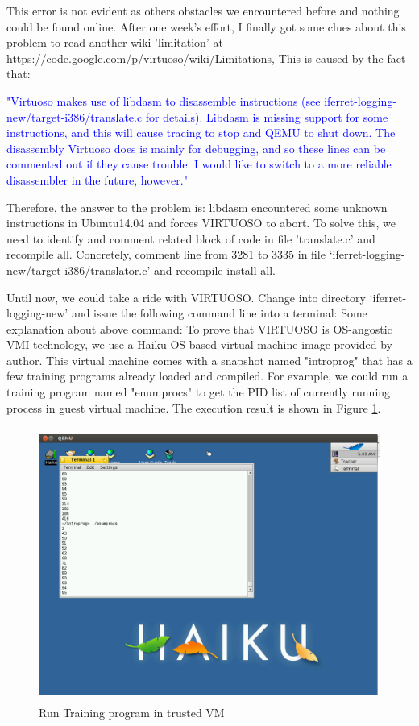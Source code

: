 This error is not evident as others obstacles we encountered before and nothing could be found online. After one week’s effort, 
I finally got some clues about this problem to read another wiki 'limitation' at https://code.google.com/p/virtuoso/wiki/Limitations,
This is caused by the fact that:

\textcolor{blue}{
  "Virtuoso makes use of libdasm to disassemble instructions (see iferret-logging-new/target-i386/translate.c for details). 
  Libdasm is missing support for some instructions, and this will cause tracing to stop and QEMU to shut down. The disassembly Virtuoso does 
  is mainly for debugging, and so these lines can be commented out if they cause trouble. I would like to switch to a more reliable disassembler 
  in the future, however."
}

Therefore, the answer to the problem is: libdasm encountered some unknown instructions in Ubuntu14.04 and forces VIRTUOSO to abort. 
To solve this, we need to identify and comment related block of code in file 'translate.c' and recompile all. Concretely, comment line 
from 3281 to 3335 in file ‘iferret-logging-new/target-i386/translator.c’ and recompile install all. 

Until now, we could take a ride with VIRTUOSO. Change into directory ‘iferret-logging-new’ and issue the following command line into a 
terminal:
Some explanation about above command: To prove that VIRTUOSO is OS-angostic VMI technology, we use a Haiku OS-based virtual machine image provided
by author. This virtual machine comes with a snapshot named "introprog" that has a few training programs already loaded and compiled. 
For example, we could run a training program named "enumprocs" to get the PID list of currently running process in guest virtual machine.
The execution result is shown in Figure \ref{fig:Run Training program in trusted VM}.
\begin{figure}[htbp]
	\centering
		\includegraphics[width=14cm, height= 9cm ]{Figures/Figure36.png}
	\caption[Run Training program in trusted VM]{Run Training program in trusted VM}
	\label{fig:Run Training program in trusted VM}
\end{figure}

